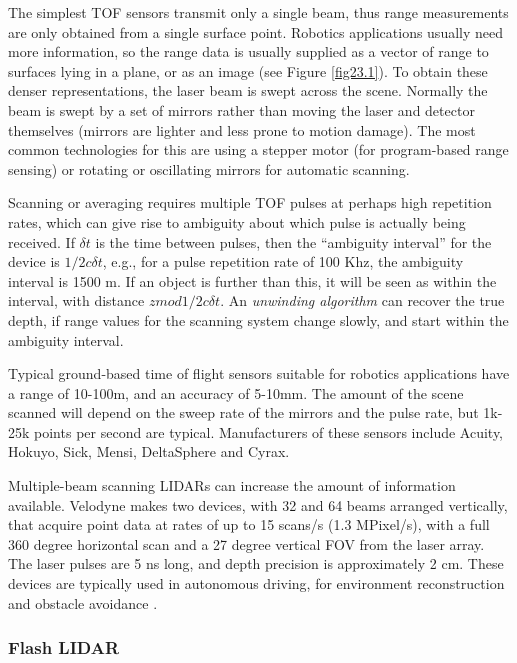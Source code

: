 \documentclass[twocolumn,oneside]{book}
\begin{document}
The simplest TOF sensors transmit only a single beam, thus range
measurements are only obtained from a single surface point.  Robotics
applications usually need more information, so the range data is
usually supplied as a vector of range to surfaces lying in a plane, or
as an image (see Figure \ref{fig23.1}).  To obtain these denser
representations, the laser beam is swept across the scene.  Normally
the beam is swept by a set of mirrors rather than moving the laser and
detector themselves (mirrors are lighter and less prone to motion
damage).  The most common technologies for this are using a stepper
motor (for program-based range sensing) or rotating or oscillating
mirrors for automatic scanning.

Scanning or averaging requires multiple TOF pulses at perhaps high
repetition rates, which can give rise to ambiguity about which pulse is
actually being received.  If $\delta t$ is the time between pulses, then
the ``ambiguity interval'' for the device is  $1/2 c \delta t$, e.g.,
for a pulse repetition rate of 100 Khz, the ambiguity interval is 1500
m.  If an object is further than this, it will be seen as within the
interval, with distance $z mod 1/2 c \delta t$.  An {\em unwinding
  algorithm} can recover the true depth, if range values for the
scanning system change slowly, and start within the ambiguity
interval. 

Typical ground-based time of flight sensors suitable for robotics
applications have a range of 10-100m, and an accuracy of 5-10mm.
The amount of the scene scanned will depend on the sweep rate of the 
mirrors and the pulse rate, but 1k-25k points per second are typical.
Manufacturers of these sensors include Acuity, Hokuyo, Sick, Mensi,
DeltaSphere and Cyrax.

Multiple-beam scanning LIDARs can increase the amount of information
available.  Velodyne \cite{} makes two devices, with 32 and 64 beams
arranged vertically, that acquire point data at rates of up to 15
scans/s (1.3 MPixel/s), with a full 360 degree horizontal scan and a
27 degree vertical FOV from the laser array.  The laser pulses are 5
ns long, and depth precision is approximately 2 cm.  These devices are
typically used in autonomous driving, for environment reconstruction
and obstacle avoidance \cite{}.

\subsubsection{Flash LIDAR}
\end{document}
